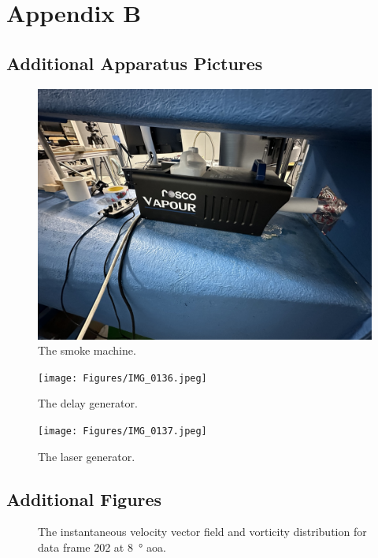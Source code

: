 \chapter{Appendix B}

\section{Additional Apparatus Pictures} \label{sec:additional_apparatus}

\begin{figure}[htpb]
    \centering
    \includegraphics[width=\linewidth]{Figures/IMG_0135.jpeg}
    \caption{The smoke machine.}
    \label{fig:smoke_machine}
\end{figure}

\begin{figure}[htpb]
    \centering
    \texttt{[image: Figures/IMG\_0136.jpeg]}
    \caption{The delay generator.}
    \label{fig:delay_generator}
\end{figure}

\begin{figure}[htpb]
    \centering
    \texttt{[image: Figures/IMG\_0137.jpeg]}
    \caption{The laser generator.}
    \label{fig:laser_generator}
\end{figure}

\newpage
\section{Additional Figures} \label{sec:additional_figures}

\begin{figure}[htpb]
    \centering
    
    \caption{The instantaneous velocity vector field and vorticity distribution for data frame \num{202} at \qty{8}{\degree} \acrshort{aoa}.}
    \label{fig:instant_aoa8}
\end{figure}

